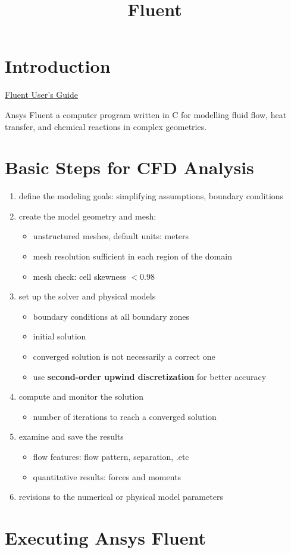 \documentclass{blog}
\title{Fluent}
\begin{document}
\maketitle
\tableofcontents
\section{Introduction}
\href{https://ansyshelp.ansys.com/public/account/secured?returnurl=/Views/Secured/corp/v261/en/flu_ug/flu_ug.html}{Fluent User's Guide}

\begin{definition}
    Ansys Fluent a computer program written in C for modelling fluid flow, heat transfer, and chemical reactions in complex geometries.
\end{definition}

\section{Basic Steps for CFD Analysis}
\begin{enumerate}
    \item define the modeling goals:
          simplifying assumptions, boundary conditions
    \item create the model geometry and mesh:
          \begin{itemize}
              \item unstructured meshes, default units: meters
              \item mesh resolution sufficient in each region of the domain
              \item mesh check: cell skewness $< 0.98$
          \end{itemize}
    \item set up the solver and physical models
          \begin{itemize}
              \item boundary conditions at all boundary zones
              \item initial solution
              \item converged solution is not necessarily a correct one
              \item use \textbf{second-order upwind discretization} for better accuracy
          \end{itemize}
    \item compute and monitor the solution
          \begin{itemize}
              \item number of iterations to reach a converged solution
          \end{itemize}
    \item examine and save the results
          \begin{itemize}
              \item flow features: flow pattern, separation, .etc
              \item quantitative results: forces and moments
          \end{itemize}
    \item revisions to the numerical or physical model parameters
\end{enumerate}

\section{Executing Ansys Fluent}

\printbibliography
\end{document}
